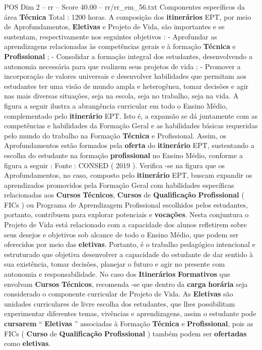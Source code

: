 \begin{textsample}{POS Dim 2 – rr – Score 40.00 – rr/rr\_em\_56.txt}
Componentes específicos da área \textbf{Técnica} Total : 1200 horas.
A composição dos \textbf{itinerários} EPT, por meio de Aprofundamentos, \textbf{Eletivas} e Projeto de Vida, são importantes e se sustentam, respectivamente nos seguintes objetivos : - Aprofundar as aprendizagens relacionadas às competências gerais e à formação \textbf{Técnica} e \textbf{Profissional} ; - Consolidar a formação integral dos estudantes, desenvolvendo a autonomia necessária para que realizem seus projetos de vida ; - Promover a incorporação de valores universais e desenvolver habilidades que permitam aos estudantes ter uma visão de mundo ampla e heterogênea, tomar decisões e agir nas mais diversas situações, seja na escola, seja no trabalho, seja na vida.
A figura a seguir ilustra a abrangência curricular em todo o Ensino Médio, complementado pelo \textbf{itinerário} EPT.
Isto é, a expansão se dá juntamente com as competências e habilidades da Formação Geral e as habilidades básicas requeridas pelo mundo do trabalho na Formação \textbf{Técnica} e Profissional.
Assim, os Aprofundamentos estão formados pela \textbf{oferta} do \textbf{itinerário} EPT, sustentando a escolha do estudante na formação \textbf{profissional} no Ensino Médio, conforme a figura a seguir : Fonte : CONSED ( 2019 ).
Verifica -se na figura que os Aprofundamentos, no caso, composto pelo \textbf{itinerário} EPT, buscam expandir os aprendizados promovidos pela Formação Geral com habilidades específicas relacionadas aos \textbf{Cursos} \textbf{Técnicos}, \textbf{Cursos} de \textbf{Qualificação} \textbf{Profissional} ( FICs ) ou Programa de Aprendizagem Profissional escolhidos pelos estudantes, portanto, contribuem para explorar potenciais e \textbf{vocações}.
Nesta conjuntura o Projeto de Vida está relacionado com a capacidade dos alunos refletirem sobre seus desejos e objetivos sob alcance de todo o Ensino Médio, que podem ser oferecidos por meio das \textbf{eletivas}.
Portanto, é o trabalho pedagógico intencional e estruturado que objetiva desenvolver a capacidade do estudante de dar sentido à sua existência, tomar decisões, planejar o futuro e agir no presente com autonomia e responsabilidade.
No caso dos \textbf{Itinerários} \textbf{Formativos} que envolvam \textbf{Cursos} \textbf{Técnicos}, recomenda -se que dentro da \textbf{carga} \textbf{horária} seja considerado o componente curricular de Projeto de Vida.
As \textbf{Eletivas} são unidades curriculares de livre escolha dos estudantes, que lhes possibilitam experimentar diferentes temas, vivências e aprendizagens, assim o estudante pode \textbf{cursarem} “ \textbf{Eletivas} ” associadas à Formação \textbf{Técnica} e \textbf{Profissional}, pois as FICs ( \textbf{Curso} de \textbf{Qualificação} \textbf{Profissional} ) também podem ser \textbf{ofertadas} como \textbf{eletivas}.

\end{textsample}
